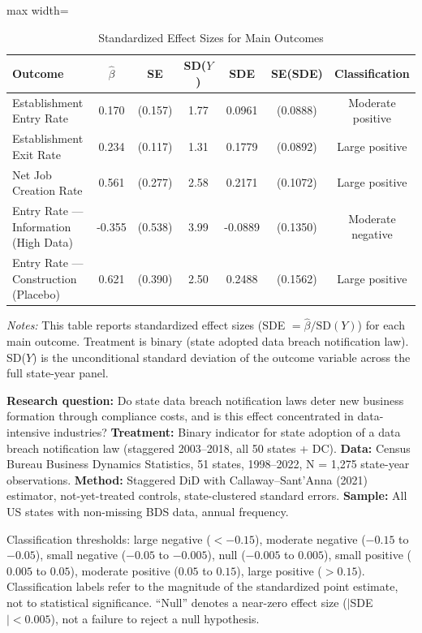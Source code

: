 \begin{table}[H]
\centering
\caption{Standardized Effect Sizes for Main Outcomes}
\label{tab:sde}
\begin{adjustbox}{max width=\textwidth}
\begin{tabular}{lcccccc}
\toprule
Outcome & $\hat{\beta}$ & SE & SD($Y$) & SDE & SE(SDE) & Classification \\
\midrule
Establishment Entry Rate & 0.170 & (0.157) & 1.77 & 0.0961 & (0.0888) & Moderate positive \\
Establishment Exit Rate & 0.234 & (0.117) & 1.31 & 0.1779 & (0.0892) & Large positive \\
Net Job Creation Rate & 0.561 & (0.277) & 2.58 & 0.2171 & (0.1072) & Large positive \\
Entry Rate --- Information (High Data) & -0.355 & (0.538) & 3.99 & -0.0889 & (0.1350) & Moderate negative \\
Entry Rate --- Construction (Placebo) & 0.621 & (0.390) & 2.50 & 0.2488 & (0.1562) & Large positive \\
\bottomrule
\end{tabular}
\end{adjustbox}
\par\vspace{0.3em}
{\footnotesize \emph{Notes:} This table reports standardized effect sizes (SDE $= \hat{\beta} / \text{SD}(Y)$) for each main outcome.
Treatment is binary (state adopted data breach notification law).
SD($Y$) is the unconditional standard deviation of the outcome variable across the full state-year panel.

\textbf{Research question:} Do state data breach notification laws deter new business formation through compliance costs, and is this effect concentrated in data-intensive industries?
\textbf{Treatment:} Binary indicator for state adoption of a data breach notification law (staggered 2003--2018, all 50 states + DC).
\textbf{Data:} Census Bureau Business Dynamics Statistics, 51 states, 1998--2022, N = 1,275 state-year observations.
\textbf{Method:} Staggered DiD with Callaway--Sant'Anna (2021) estimator, not-yet-treated controls, state-clustered standard errors.
\textbf{Sample:} All US states with non-missing BDS data, annual frequency.

Classification thresholds: large negative ($< -0.15$), moderate negative ($-0.15$ to $-0.05$),
small negative ($-0.05$ to $-0.005$), null ($-0.005$ to $0.005$),
small positive ($0.005$ to $0.05$), moderate positive ($0.05$ to $0.15$),
large positive ($> 0.15$).
Classification labels refer to the magnitude of the standardized point estimate,
not to statistical significance. ``Null'' denotes a near-zero effect size ($|$SDE$| < 0.005$),
not a failure to reject a null hypothesis.}
\end{table}
